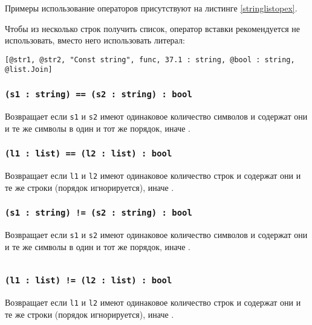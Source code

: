 Примеры использование операторов присутствуют на листинге \ref{stringlistopex}.

Чтобы из несколько строк получить список, оператор вставки рекомендуется не использовать, вместо него использовать литерал:
\begin{verbatim}
[@str1, @str2, "Const string", func, 37.1 : string, @bool : string, @list.Join]
\end{verbatim}

\subsubsection{\texttt{(s1 : string) == (s2 : string) : bool}}

Возвращает \true{} если \texttt{s1} и \texttt{s2} имеют одинаковое количество символов и содержат они и те же символы в один и тот же порядок, иначе \false{}.

\subsubsection{\texttt{(l1 : list) == (l2 : list) : bool}}

Возвращает \true{} если \texttt{l1} и \texttt{l2} имеют одинаковое количество строк и содержат они и те же строки (порядок игнорируется), иначе \false{}.

\subsubsection{\texttt{(s1 : string) != (s2 : string) : bool}}

Возвращает \false{} если \texttt{s1} и \texttt{s2} имеют одинаковое количество символов и содержат они и те же символы в один и тот же порядок, иначе \true{}.

\begin{sourcecode}
	\label{stringlistopex}
	\inputminted[linenos]{icl}{../sources/stringlistopex.icL}
\end{sourcecode}

\subsubsection{\texttt{(l1 : list) != (l2 : list) : bool}}

Возвращает \false{} если \texttt{l1} и \texttt{l2} имеют одинаковое количество строк и содержат они и те же строки (порядок игнорируется), иначе \true{}.

